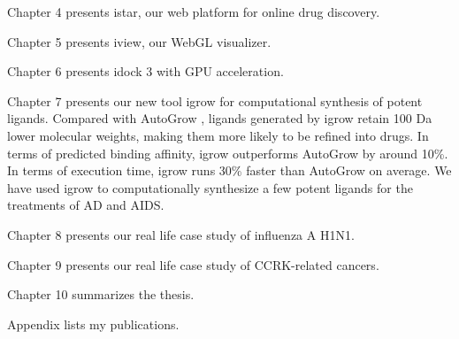 Chapter 4 presents istar, our web platform for online drug discovery.

Chapter 5 presents iview, our WebGL visualizer.

Chapter 6 presents idock 3 with GPU acceleration.

Chapter 7 presents our new tool igrow for computational synthesis of potent ligands. Compared with AutoGrow \citep{466}, ligands generated by igrow retain 100 Da lower molecular weights, making them more likely to be refined into drugs. In terms of predicted binding affinity, igrow outperforms AutoGrow by around 10\%. In terms of execution time, igrow runs 30\% faster than AutoGrow on average. We have used igrow to computationally synthesize a few potent ligands for the treatments of AD and AIDS.

Chapter 8 presents our real life case study of influenza A H1N1.

Chapter 9 presents our real life case study of CCRK-related cancers.

Chapter 10 summarizes the thesis.

Appendix lists my publications.

\chapterend
